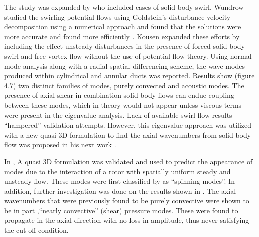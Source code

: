 The study was expanded by \cite{KERREBROCK1974,YURKOVICH1975} who
included cases of solid body swirl. Wundrow studied the swirling potential flows using Goldstein's disturbance velocity
decomposition \cite{Goldstein1978} using a numerical approach and found that the solutions
were more accurate and found more efficiently \cite{KERREBROCK1974}. Kousen expanded these efforts by including \cite{kousen1996pressure,kousen1995eigenmode} the effect unsteady disturbances in the presence of 
forced solid body-swirl and free-vortex flow without the use of potential flow theory. Using normal 
mode analysis along with a radial spatial differencing scheme, the wave modes produced within cylindrical and annular ducts was 
reported. Results show (figure 4.7) two distinct families of modes, purely convected and acoustic 
modes. The presence of axial shear in combination solid body flows can endue coupling between these modes, which 
in theory would not appear unless viscous terms were present in the eigenvalue analysis. Lack of available swirl flow 
results ``hampered'' validation attempts. However, this eigenvalue approach was utilized with a new quasi-3D 
formulation to find the axial wavenumbers from solid body flow was proposed in his next work . 

In \cite{kousen1995eigenmode}, A quasi 3D formulation was validated and used to predict 
the appearance of modes due to the interaction of a rotor with spatially 
uniform steady and unsteady flow. These modes were first classified by 
\cite{Tyler1962} as ``spinning modes''. In addition, further investigation was 
done on the results shown in \cite{kousen1995eigenmode}. The axial wavenumbers that 
were previously found to be purely convective were shown to be in part
,``nearly convective'' (shear) pressure modes. These were found to propagate in the 
axial direction with no loss in amplitude, thus never satisfying the cut-off condition. 


